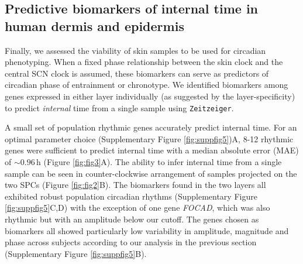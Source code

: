 
\subsection*{Predictive biomarkers of internal time in human dermis and epidermis}
Finally, we assessed the viability of skin samples to be used for circadian phenotyping. When a fixed phase relationship between the skin clock and the central SCN clock is assumed, these biomarkers can serve as predictors of circadian phase of entrainment or chronotype. We identified biomarkers among genes expressed in either layer individually (as suggested by the layer-specificity) to predict \textit{internal} time from a single sample using \texttt{Zeitzeiger}.

A small set of population rhythmic genes accurately predict internal time. For an optimal parameter choice (Supplementary Figure \ref{fig:suppfig5})A, 8-12 rhythmic genes were sufficient to predict internal time with a median absolute error (MAE) of $\sim 0.96$\,h (Figure \ref{fig:fig3}A). The ability to infer internal time from a single sample can be seen in counter-clockwise arrangement of samples projected on the two SPCs (Figure \ref{fig:fig2}B). The biomarkers found in the two layers all exhibited robust population circadian rhythms (Supplementary Figure \ref{fig:suppfig5}C,D) with the exception of one gene \textit{FOCAD}, which was also rhythmic but with an amplitude below our cutoff. The genes chosen as biomarkers all showed particularly low variability in amplitude, magnitude and phase across subjects according to our analysis in the previous section (Supplementary Figure \ref{fig:suppfig5}B).

